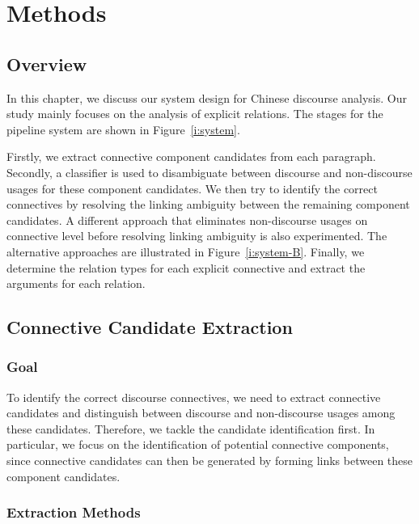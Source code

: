 %
%
%
\chapter{Methods}
\label{c:method}

\section{Overview}

In this chapter, we discuss our system design for Chinese discourse analysis.
Our study mainly focuses on the analysis of explicit relations.
The stages for the pipeline system are shown in Figure~\ref{i:system}.



Firstly, we extract connective component candidates from each paragraph.
Secondly, a classifier is used to disambiguate between discourse and
non-discourse usages for these component candidates. We then try to identify
the correct connectives by resolving the linking ambiguity between the remaining
component candidates.
A different approach that eliminates non-discourse usages on connective level
before resolving linking ambiguity is also experimented. The alternative
approaches are illustrated in Figure~\ref{i:system-B}.
Finally, we determine the relation types for each explicit
connective and extract the arguments for each relation.




\section{Connective Candidate Extraction}

\subsection{Goal}

To identify the correct discourse connectives, we need to
extract connective candidates and distinguish between discourse
and non-discourse usages among these candidates. Therefore, we tackle the
candidate identification first. In particular, we focus on the identification
of potential connective components, since connective candidates can then be
generated by forming links between these component candidates.

\subsection{Extraction Methods}

